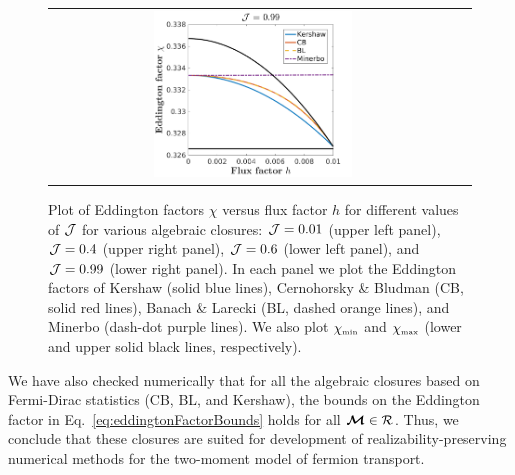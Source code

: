\begin{figure}[h]
\begin{tabular}{cc}
    \includegraphics[width=0.5\textwidth]{figures/Closures0_99}
  \end{tabular}
   \caption{Plot of Eddington factors $\chi$ versus flux factor $h$ for different values of $\mathcal{J}$ for various algebraic closures: $\mathcal{J}=0.01$ (upper left panel), $\mathcal{J}=0.4$ (upper right panel), $\mathcal{J}=0.6$ (lower left panel), and $\mathcal{J}=0.99$ (lower right panel).  In each panel we plot the Eddington factors of Kershaw (solid blue lines), Cernohorsky \& Bludman (CB, solid red lines), Banach \& Larecki (BL, dashed orange lines), and Minerbo (dash-dot purple lines).  We also plot $\chi_{\mbox{\tiny min}}$ and $\chi_{\mbox{\tiny max}}$ (lower and upper solid black lines, respectively).}
  \label{fig:EddingtonFactorsWithDifferentClosure}
\end{figure}
We have also checked numerically that for all the algebraic closures based on Fermi-Dirac statistics (CB, BL, and Kershaw), the bounds on the Eddington factor in Eq.~\eqref{eq:eddingtonFactorBounds} holds for all $\boldsymbol{\mathcal{M}}\in\mathcal{R}$.  
Thus, we conclude that these closures are suited for development of realizability-preserving numerical methods for the two-moment model of fermion transport.  

